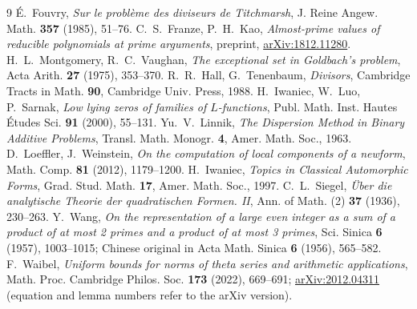 ﻿\documentclass[11pt]{amsart}
\theoremstyle{remark}
\begin{document}
\begin{thebibliography}{9}
 \'E.~Fouvry, \emph{Sur le probl\`eme des diviseurs de Titchmarsh}, J. Reine Angew. Math. \textbf{357} (1985), 51--76.
 C.~S.~Franze, P.~H.~Kao, \emph{Almost-prime values of reducible polynomials at prime arguments}, preprint, \href{https://arxiv.org/abs/1812.11280}{arXiv:1812.11280}.
 H.~L.~Montgomery, R.~C.~Vaughan, \emph{The exceptional set in Goldbach's problem}, Acta Arith. \textbf{27} (1975), 353--370.
 R.~R.~Hall, G.~Tenenbaum, \emph{Divisors}, Cambridge Tracts in Math. \textbf{90}, Cambridge Univ. Press, 1988.
 H.~Iwaniec, W.~Luo, P.~Sarnak, \emph{Low lying zeros of families of $L$-functions}, Publ. Math. Inst. Hautes \'Etudes Sci. \textbf{91} (2000), 55--131.
 Yu.~V.~Linnik, \emph{The Dispersion Method in Binary Additive Problems}, Transl. Math. Monogr. \textbf{4}, Amer. Math. Soc., 1963.
 D.~Loeffler, J.~Weinstein, \emph{On the computation of local components of a newform}, Math. Comp. \textbf{81} (2012), 1179--1200.
 H.~Iwaniec, \emph{Topics in Classical Automorphic Forms}, Grad. Stud. Math. \textbf{17}, Amer. Math. Soc., 1997.
 C.~L.~Siegel, \emph{\"Uber die analytische Theorie der quadratischen Formen. II}, Ann. of Math. (2) \textbf{37} (1936), 230--263.
 Y.~Wang, \emph{On the representation of a large even integer as a sum of a product of at most 2 primes and a product of at most 3 primes}, Sci. Sinica \textbf{6} (1957), 1003--1015; Chinese original in Acta Math. Sinica \textbf{6} (1956), 565--582.
 F.~Waibel, \emph{Uniform bounds for norms of theta series and arithmetic applications}, Math. Proc. Cambridge Philos. Soc. \textbf{173} (2022), 669--691; \href{https://arxiv.org/abs/2012.04311}{arXiv:2012.04311} (equation and lemma numbers refer to the arXiv version).
\end{thebibliography}
\end{document}
